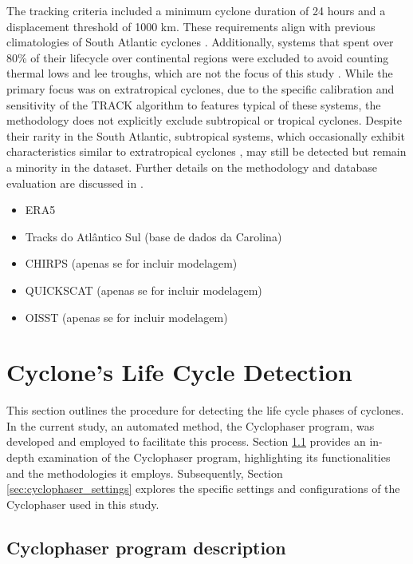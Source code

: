 The tracking criteria included a minimum cyclone duration of 24 hours and a displacement threshold of 1000 km. These requirements align with previous climatologies of South Atlantic cyclones \citep{sinclair1995climatology, gramcianinov2019properties}. Additionally, systems that spent over 80\% of their lifecycle over continental regions were excluded to avoid counting thermal lows and lee troughs, which are not the focus of this study \citep{crespo2021potential}. While the primary focus was on extratropical cyclones, due to the specific calibration and sensitivity of the TRACK algorithm to features typical of these systems, the methodology does not explicitly exclude subtropical or tropical cyclones. Despite their rarity in the South Atlantic, subtropical systems, which occasionally exhibit characteristics similar to extratropical cyclones \citep{hart2003cyclone}, may still be detected but remain a minority in the dataset. Further details on the methodology and database evaluation are discussed in \cite{gramcianinov2020analysis}.

\begin{itemize}
    \item ERA5
    \item Tracks do Atlântico Sul (base de dados da Carolina)
    \item CHIRPS (apenas se for incluir modelagem)
    \item QUICKSCAT (apenas se for incluir modelagem)
    \item OISST (apenas se for incluir modelagem)
\end{itemize}

\section{Cyclone's Life Cycle Detection}
\label{sec:cyclone_life_cycle_detection}

This section outlines the procedure for detecting the life cycle phases of cyclones. In the current study, an automated method, the Cyclophaser program, was developed and employed to facilitate this process. Section \ref{sec:cyclophaser_description} provides an in-depth examination of the Cyclophaser program, highlighting its functionalities and the methodologies it employs. Subsequently, Section \ref{sec:cyclophaser_settings} explores the specific settings and configurations of the Cyclophaser used in this study.

\subsection{Cyclophaser program description} \label{sec:cyclophaser_description}

